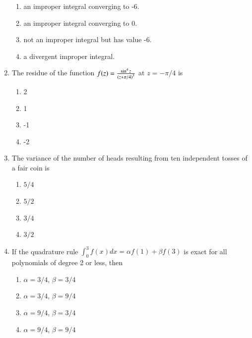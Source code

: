 \documentclass[a4paper,10pt]{article}
\begin{document}
\begin{enumerate}
\begin{enumerate}
\item an improper integral converging to -6.
\item an improper integral converging to 0.
\item not an improper integral but has value -6.
\item a divergent improper integral.
\end{enumerate}

\item The residue of the function $f(z) = \frac{\sin^4 z}{\left(z+\pi/4\right)^3}$ at $z = -\pi/4$ is
\hfill{}

\begin{multicols}{4}
\begin{enumerate}
\item 2
\item 1
\item -1
\item -2
\end{enumerate}
\end{multicols}

\item The variance of the number of heads resulting from ten independent tosses of a fair coin is
\hfill{}

\begin{multicols}{4}
\begin{enumerate}
\item $5/4$
\item $5/2$
\item $3/4$
\item $3/2$
\end{enumerate}
\end{multicols}

\item If the quadrature rule $\int_{0}^{3} f(x)dx = \alpha f(1) + \beta f(3)$ is exact for all polynomials of degree 2 or less, then
\hfill{}

\begin{multicols}{2}
\begin{enumerate}
\item $\alpha = 3/4$, $\beta = 3/4$
\item $\alpha = 3/4$, $\beta = 9/4$
\item $\alpha = 9/4$, $\beta = 3/4$
\item $\alpha = 9/4$, $\beta = 9/4$
\end{enumerate}
\end{multicols}


\end{enumerate}
\end{document}
